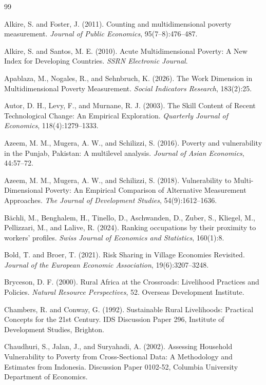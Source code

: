 \documentclass[11pt]{article}
\begin{document}
\begin{thebibliography}{99}

 Alkire, S. and Foster, J. (2011). Counting and multidimensional poverty measurement. \textit{Journal of Public Economics}, 95(7--8):476--487.

 Alkire, S. and Santos, M. E. (2010). Acute Multidimensional Poverty: A New Index for Developing Countries. \textit{SSRN Electronic Journal}.

 Apablaza, M., Nogales, R., and Sehnbruch, K. (2026). The Work Dimension in Multidimensional Poverty Measurement. \textit{Social Indicators Research}, 183(2):25.

 Autor, D. H., Levy, F., and Murnane, R. J. (2003). The Skill Content of Recent Technological Change: An Empirical Exploration. \textit{Quarterly Journal of Economics}, 118(4):1279--1333.

 Azeem, M. M., Mugera, A. W., and Schilizzi, S. (2016). Poverty and vulnerability in the Punjab, Pakistan: A multilevel analysis. \textit{Journal of Asian Economics}, 44:57--72.

 Azeem, M. M., Mugera, A. W., and Schilizzi, S. (2018). Vulnerability to Multi-Dimensional Poverty: An Empirical Comparison of Alternative Measurement Approaches. \textit{The Journal of Development Studies}, 54(9):1612--1636.

 B\"achli, M., Benghalem, H., Tinello, D., Aschwanden, D., Zuber, S., Kliegel, M., Pellizzari, M., and Lalive, R. (2024). Ranking occupations by their proximity to workers' profiles. \textit{Swiss Journal of Economics and Statistics}, 160(1):8.

 Bold, T. and Broer, T. (2021). Risk Sharing in Village Economies Revisited. \textit{Journal of the European Economic Association}, 19(6):3207--3248.

 Bryceson, D. F. (2000). Rural Africa at the Crossroads: Livelihood Practices and Policies. \textit{Natural Resource Perspectives}, 52. Overseas Development Institute.

 Chambers, R. and Conway, G. (1992). Sustainable Rural Livelihoods: Practical Concepts for the 21st Century. IDS Discussion Paper 296, Institute of Development Studies, Brighton.

 Chaudhuri, S., Jalan, J., and Suryahadi, A. (2002). Assessing Household Vulnerability to Poverty from Cross-Sectional Data: A Methodology and Estimates from Indonesia. Discussion Paper 0102-52, Columbia University Department of Economics.


\end{thebibliography}
\end{document}
